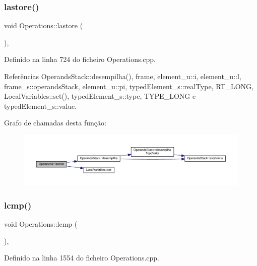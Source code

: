 \subsubsection{\texorpdfstring{lastore()}{lastore()}}
{\footnotesize\ttfamily void Operations\+::lastore (\begin{DoxyParamCaption}{ }\end{DoxyParamCaption})\hspace{0.3cm}{\ttfamily [static]}, {\ttfamily [private]}}



Definido na linha 724 do ficheiro Operations.\+cpp.



Referências Operands\+Stack\+::desempilha(), frame, element\+\_\+u\+::i, element\+\_\+u\+::l, frame\+\_\+s\+::operands\+Stack, element\+\_\+u\+::pi, typed\+Element\+\_\+s\+::real\+Type, R\+T\+\_\+\+L\+O\+NG, Local\+Variables\+::set(), typed\+Element\+\_\+s\+::type, T\+Y\+P\+E\+\_\+\+L\+O\+NG e typed\+Element\+\_\+s\+::value.

Grafo de chamadas desta função\+:\nopagebreak
\begin{figure}[H]
\begin{center}
\leavevmode
\includegraphics[width=350pt]{classOperations_a562813150c331183212c11e5593b83c6_cgraph}
\end{center}
\end{figure}
\mbox{\label{classOperations_a7ad4ad0e417096686b55dde9142b830a}} 
\subsubsection{\texorpdfstring{lcmp()}{lcmp()}}
{\footnotesize\ttfamily void Operations\+::lcmp (\begin{DoxyParamCaption}{ }\end{DoxyParamCaption})\hspace{0.3cm}{\ttfamily [static]}, {\ttfamily [private]}}



Definido na linha 1554 do ficheiro Operations.\+cpp.



